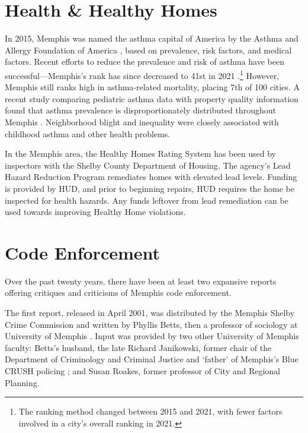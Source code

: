 \documentclass[
]{book}
\begin{document}
\hypertarget{health-healthy-homes}{%
\section{Health \& Healthy Homes}\label{health-healthy-homes}}

In 2015, Memphis was named the asthma capital of America by the Asthma and Allergy Foundation of America \citep{aafa2015}, based on prevalence, risk factors, and medical factors. Recent efforts to reduce the prevalence and risk of asthma have been successful---Memphis's rank has since decreased to 41st in 2021 \citep{aafa2021}.\footnote{The ranking method changed between 2015 and 2021, with fewer factors involved in a city's overall ranking in 2021.} However, Memphis still ranks high in asthma-related mortality, placing 7th of 100 cities. A recent study comparing pediatric asthma data with property quality information found that asthma prevalence is disproportionately distributed throughout Memphis \citep{shin2018}. Neighborhood blight and inequality were closely associated with childhood asthma and other health problems.

In the Memphis area, the Healthy Homes Rating System has been used by inspectors with the Shelby County Department of Housing. The agency's Lead Hazard Reduction Program remediates homes with elevated lead levels. Funding is provided by HUD, and prior to beginning repairs, HUD requires the home be inspected for health hazards. Any funds leftover from lead remediation can be used towards improving Healthy Home violations.

\hypertarget{code-enforcement}{%
\section{Code Enforcement}\label{code-enforcement}}

Over the past twenty years, there have been at least two expansive reports offering critiques and criticisms of Memphis code enforcement.

The first report, released in April 2001, was distributed by the Memphis Shelby Crime Commission and written by Phyllis Betts, then a professor of sociology at University of Memphis \citep{betts2001}. Input was provided by two other University of Memphis faculty: Betts's husband, the late Richard Janikowski, former chair of the Department of Criminology and Criminal Justice and `father' of Memphis's Blue CRUSH policing \citep{poe2021}; and Susan Roakes, former professor of City and Regional Planning.
\end{document}

